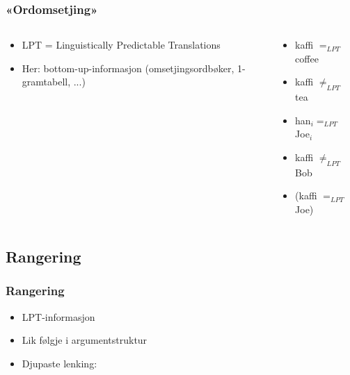 \documentclass[xcolor=x11names,compress,bigger]{beamer}
\renewcommand{\(}{\begin{columns}}
\renewcommand{\)}{\end{columns}}
\newcommand{\<}[1]{\begin{column}{#1}}
\renewcommand{\>}{\end{column}}
\begin{document}
\begin{frame}\frametitle{«Ordomsetjing»}
  \begin{columns}
    \begin{column}{0.5\textwidth}
      \begin{itemize}
      \item LPT = Linguistically Predictable Translations
      \item Her: bottom-up-informasjon (omsetjingsordbøker, 1-gramtabell, ...)
      \end{itemize}
    \end{column}

    \begin{column}{0.5\textwidth}
      \begin{itemize}
      \item kaffi $=_{LPT}$ coffee
      \item kaffi $\neq_{LPT}$ tea
      \item han$_i =_{LPT}$ Joe$_i$
      \item kaffi $\neq_{LPT}$ Bob\\[0.5cm]
      \item (kaffi $=_{LPT}$ Joe)
      \end{itemize}
    \end{column}
  \end{columns}
\end{frame}

\subsection{Rangering}
\begin{frame}\frametitle{Rangering}
  \begin{itemize}
  \item LPT-informasjon
  \item Lik følgje i argumentstruktur
  \item Djupaste lenking:
      {\avmoptions{}
  }
  \end{itemize}
\end{frame}
\end{document}
